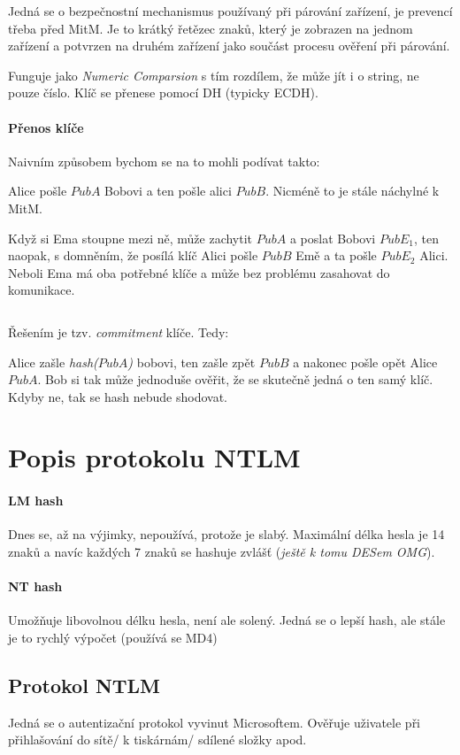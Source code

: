 \documentclass[10pt,a4paper]{article}
\begin{document}
Jedná se o bezpečnostní mechanismus používaný při párování zařízení, je prevencí třeba před MitM.
Je to krátký řetězec znaků, který je zobrazen na jednom zařízení a potvrzen na druhém zařízení jako součást procesu ověření při párování.

Funguje jako \textit{Numeric Comparsion} s tím rozdílem, že může jít i o string, ne pouze číslo.
Klíč se přenese pomocí DH (typicky ECDH).

\paragraph{Přenos klíče}

Naivním způsobem bychom se na to mohli podívat takto:

Alice pošle $ PubA $ Bobovi a ten pošle alici $ PubB $. Nicméně to je stále náchylné k MitM.

Když si Ema stoupne mezi ně, může zachytit $ PubA $ a poslat Bobovi $ PubE_1 $, ten naopak, s domněním, že posílá klíč Alici pošle $ PubB $ Emě a ta pošle $ PubE_2 $ Alici. 
Neboli Ema má oba potřebné klíče a může bez problému zasahovat do komunikace.

$ $

Řešením je tzv. \textit{commitment} klíče. Tedy:

Alice zašle \textit{hash($ PubA $)} bobovi, ten zašle zpět $ PubB $ a nakonec pošle opět Alice $ PubA $.
Bob si tak může jednoduše ověřit, že se skutečně jedná o ten samý klíč. Kdyby ne, tak se hash nebude shodovat.

\section{Popis protokolu NTLM}

\paragraph{LM hash}
Dnes se, až na výjimky, nepoužívá, protože je slabý. Maximální délka hesla je 14 znaků a navíc každých 7 znaků se hashuje zvlášť (\textit{ještě k tomu DESem OMG}).

\paragraph{NT hash}
Umožňuje libovolnou délku hesla, není ale solený. 
Jedná se o lepší hash, ale stále je to rychlý výpočet (používá se MD4)

\subsection{Protokol NTLM}
Jedná se o autentizační protokol vyvinut Microsoftem. Ověřuje uživatele při přihlašování do sítě/ k tiskárnám/ sdílené složky apod.
\end{document}
